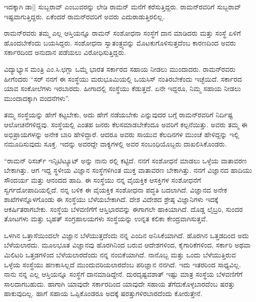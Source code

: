 ಇದಕ್ಕಾಗಿ ಡಾ|| ಸುಬ್ಬರಾವ್ ಎಂಬುವರನ್ನು ಲೇಡಿ ರಾಮನ್ ಮನೆಗೆ ಕರೆಸುತ್ತಿದ್ದರು. ರಾಮನ್‍ರವರಿಗೆ ಸುಬ್ಬರಾವ್ ಇಷ್ಟವಾಗುತ್ತಿದ್ದರು. ಏಕೆಂದರೆ ರಾಮನ್‍ರವರಿಗೆ ಅವರು ಎದುರಾಡುತ್ತಿರಲಿಲ್ಲ.



ರಾಮನ್‍ರವರು ತಮ್ಮ ಎಲ್ಲ ಆಸ್ತಿಯನ್ನೂ ರಾಮನ್ ಸಂಶೋಧನಾ ಸಂಸ್ಥೆಗೆ ದಾನ ಮಾಡಿದರು ಮತ್ತು ಸಂಸ್ಥೆ ಏಳಿಗೆ ಹೊಂದಬೇಕೆಂದು ಬಯಸಿದ್ದರು. ಸಂಶೋಧನಾ ಸ್ವಾತಂತ್ರ್ಯವನ್ನು ಮೊಟಕುಗೊಳಿಸುತ್ತದೆಂಬ ಕಾರಣದಿಂದ ಅವರು ಸರ್ಕಾರದಿಂದ ಅನುದಾನ ಪಡೆಯಲು ವಿರೋಧಿಸುತ್ತಿದ್ದರು.

ವಿದ್ಯಾಭ್ಯಾಸ ಮಂತ್ರಿ ಎಂ.ಸಿ.ಛಗ್ಲಾ ಒಮ್ಮೆ ಭಾರತ ಸರ್ಕಾರದ ಸಹಾಯ ನೀಡಲು ಮುಂದಾದರು. ರಾಮನ್‍ರವರು ಹೀಗೆಂದರು\enginline{-} “ಸರ್ ನನಗೆ ಈ ಸಂಸ್ಥೆಯು ಮರುಭೂಮಿಯಲ್ಲಿ ಒಯಸಿಸ್ ನಂತಿರಬೇಕೆಂದು ಇಚ್ಛೆಯಿದೆ. ಸರ್ಕಾರದ ಯಾವ ಸಂಕೋಲೆಗಳು ಇರಬಾರದು. ಹೀಗಾದಲ್ಲಿ ಸಂಸ್ಥೆಯು ಕೆಡುತ್ತದೆ. ಏನೇ ಇದ್ದರೂ, ನಿಮ್ಮ ಸಹಾಯ ನೀಡಲು ಮುಂದಾದಕ್ಕಾಗಿ ವಂದನೆಗಳು”.

ತಮ್ಮ ಸಂಸ್ಥೆಯನ್ನು ಹೇಗೆ ಕಟ್ಟಬೇಕು, ಅದು ಹೇಗೆ ನಡೆಯಬೇಕು ಎನ್ನುವುದರ ಬಗ್ಗೆ ರಾಮನ್‍ರವರಿಗೆ ನಿರ್ದಿಷ್ಟ ಆಲೋಚನೆಗಳಿದ್ದವು. ಸಂಸ್ಥೆಯಲ್ಲಿ ಎಂತಹ ಜನರು ಕೆಲಸಮಾಡಬೇಕೆಂದೂ ಅವರಿಗೆ ಕಲ್ಪನೆಯಿತ್ತು. ಅವರು ತಮ್ಮ ಈ ಅಭಿಪ್ರಾಯಗಳನ್ನು ಅನೇಕ ಬಾರಿ ಹೇಳಿದ್ದಾರೆ. ಆದರೂ ಅವರು ಸಾಯುವ ಕೆಲದಿನಗಳ ಮುಂಚೆ ಹೇಳಿದ್ದನ್ನು ಇಲ್ಲಿ ನಮೂದಿಸುವುದು ಸೂಕ್ತ. ಇದನ್ನು ಅವರದ್ದೇ ವಾಕ್ಯಗಳಲ್ಲಿ ಅವರ ಸಂಬಂಧಿಯೊಬ್ಬರು ದಾಖಲಿಸಿಕೊಂಡರು.

“ರಾಮನ್ ರಿಸರ್ಚ್ ಇನ್ಸಿಟಿಟ್ಯೂಟ್ ಅನ್ನು ನಾನು ರಲ್ಲಿ ಕಟ್ಟಿದೆ. ನನಗೆ ಸಂಶೋಧನೆ ಮಾಡಲು ಒಳ್ಳೆಯ ವಾತಾವರಣ ಬೇಕಾಗಿತ್ತು. ಆಗ ಇದ್ದ ಸ್ಥಳೀಯ ವಿಜ್ಞಾನ ಸಂಸ್ಥೆಗಳಿಗಿಂತ ಮುಕ್ತ ವಾತಾವರಣ ಬೇಕಾಗಿತ್ತು. ನನಗೆ ವಿಜ್ಞಾನದ ಹಾದಿಯು ಸೌಂದರ್ಯ ಮತ್ತು ಆನಂದದ ಹಾದಿ. ಈ ಸಂಸ್ಥೆಯು ನನ್ನ ವೈಯಕ್ತಿಕ ಆಸಕ್ತಿಗಳ ಸಂಶೋಧನೆಗೆ ಸ್ವರ್ಗದೋಪಾದಿಯಲ್ಲಿದೆ. ನನ್ನ ಬಳಿಕ ಈ ವೈಯಕ್ತಿಕ ಸಂಶೋಧನಾ ಪದ್ಧತಿ ಬದಲಾಗಿದೆ. ವಿಜ್ಞಾನದ ಅನೇಕ ಶಾಖೆಗಳನ್ನೊಳಗೊಂಡು ಈ ಸಂಸ್ಥೆಯು ಬೆಳೆಯಬೇಕಾಗಿದೆ. ದೇಶ ವಿದೇಶದ ಶ್ರೇಷ್ಠ ವಿಜ್ಞಾನಿಗಳು ಇದಕ್ಕೆ ಆಕರ್ಷಿತರಾಗಬೇಕು. ಸಂಸ್ಥೆಯ ಬೆಳವಣಿಗೆಗೆ ಆಸ್ತಿಭಾರವನ್ನು ಈಗಾಗಲೇ ಹಾಕಿಯಾಗಿದೆ. ದೊಡ್ಡ ಲೈಬ್ರರಿ, ಸುಂದರ ತೋಟಗಳು ಮತ್ತು ಬೃಹತ್ ಸಂಗ್ರಹಾಲಯಗಳು ಸಂಸ್ಥೆಯನ್ನು ಉನ್ನತ ಕಲಿಕಾ ಕೇಂದ್ರವಾಗಿಸುತ್ತವೆ.

ಒಳಗಿನ ಒತ್ತಾಸೆಯಿಂದಲೇ ವಿಜ್ಞಾನ ಬೆಳೆಯುತ್ತದೆಂದು ನನ್ನ ಎಂದಿನ ಅನಿಸಿಕೆಯಾಗಿದೆ. ಹೊರಗಿನ ಒತ್ತಡದಿಂದ ಅದು ಬೆಳೆಯಲಾರದು. ಮೂಲಭೂತ ವಿಜ್ಞಾನವು ಹೊರಗಿನಿಂದ ಬರುವ ಆದೇಶಗಳಿಂದ, ಕೈಗಾರಿಕೆಗಳಿಂದ, ಸರ್ಕಾರಿ ಅಥವಾ ಮಿಲಿಟರಿ ಒತ್ತಡಗಳಿಂದ ಬೆಳೆಯಲಾರದೆಂದು ನನ್ನ ನಂಬಿಕೆಯಾಗಿದೆ. ನಾನೊಬ್ಬ  ಮತ್ತು ಒಂದು ಬೆಳೆಯುತ್ತಿರುವ ಒಳ್ಳೆಯ ಸಂಸ್ಥೆಯು ಹಣಕಾಸಿಲ್ಲದೆ ಮುಂದುವರಿಯಲಾರದೆಂಬ ಪರಿಜ್ಞಾನ ನನಗಿದೆ. ಇದು ಇತರರಿಂದ ಸಾಧ್ಯವಿಲ್ಲ. ನಾನು ನನ್ನ ಎಲ್ಲ ಆಸ್ತಿಯನ್ನೂ ಸಂಸ್ಥೆಗೆ ದಾನಮಾಡಿದ್ದೇನೆ. ದುರದೃಷ್ಟವಶಾತ್ ಇಷ್ಟು ಮಾತ್ರ ಸಂಸ್ಥೆಯ ಬೆಳವಣಿಗೆಗೆ ಸಾಲದಾಗಬಹುದು. ಹಾಗಾಗಿ ಯಾವುದೇ ಸರ್ಕಾರದಿಂದ ಯಾವುದೇ ಸಹಾಯ ತೆಗೆದುಕೊಳ್ಳಬಾರದೆಂಬ ಷರತ್ತು ಹಾಕುವುದಿಲ್ಲ. ಹಾಗೆ ಸಹಾಯ ಒಪ್ಪಿಕೊಂಡರೂ ಅದಕ್ಕೆ ಷರತ್ತುಗಳಿರಬಾರದೆಂದು ಕೋರುತ್ತೇನೆ.

